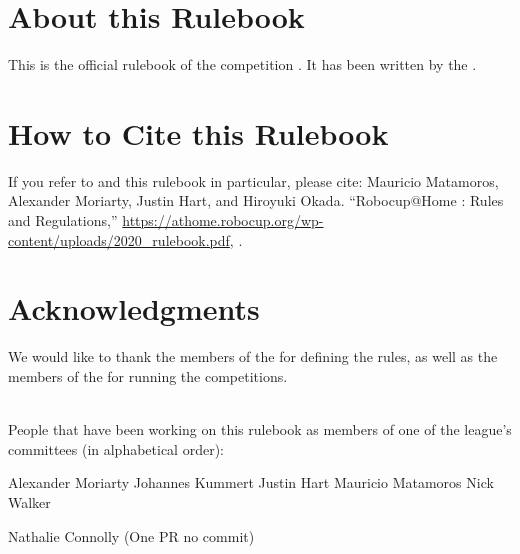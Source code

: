 


\section*{About this Rulebook}  
This is the official rulebook of the \AtHome{} competition \YEAR.
It has been written by the \YEAR{} \TC{}.


\section*{How to Cite this Rulebook} 
If you refer to \AtHome{} and this rulebook in particular, please cite:
Mauricio Matamoros, Alexander Moriarty, Justin Hart, and Hiroyuki Okada.
\enquote{Robocup@Home \YEAR: Rules and Regulations,}
\url{https://athome.robocup.org/wp-content/uploads/2020_rulebook.pdf}, \YEAR.

\begin{center}
\begin{minipage}{0.8\textwidth}
	\scriptsize%
	
\end{minipage}
\end{center}

\section*{Acknowledgments}
\label{sec:acknowledgments}
We would like to thank the members of the \TC{} for defining the rules, as well as the members of the \OC{} for running the competitions.

~\\\noindent People that have been working on this rulebook as members of one of the league's committees (in alphabetical order):
\begin{center}
	\begin{minipage}{0.8\textwidth}
		\begin{multicols}{3}%
			\footnotesize
			\noindent%
			
Alexander Moriarty
Johannes Kummert
Justin Hart
Mauricio Matamoros
Nick Walker
			
			Nathalie Connolly (One PR no commit)
			
		\end{multicols}
	\end{minipage}
\end{center}

